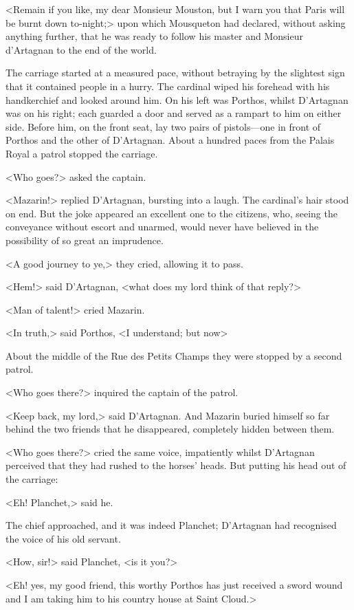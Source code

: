 <Remain if you like, my dear Monsieur Mouston, but I warn you that Paris will be burnt down to-night;> upon which Mousqueton had declared, without asking anything further, that he was ready to follow his master and Monsieur d'Artagnan to the end of the world.

The carriage started at a measured pace, without betraying by the slightest sign that it contained people in a hurry. The cardinal wiped his forehead with his handkerchief and looked around him. On his left was Porthos, whilst D'Artagnan was on his right; each guarded a door and served as a rampart to him on either side. Before him, on the front seat, lay two pairs of pistols—one in front of Porthos and the other of D'Artagnan. About a hundred paces from the Palais Royal a patrol stopped the carriage.

<Who goes?> asked the captain.

<Mazarin!> replied D'Artagnan, bursting into a laugh. The cardinal's hair stood on end. But the joke appeared an excellent one to the citizens, who, seeing the conveyance without escort and unarmed, would never have believed in the possibility of so great an imprudence.

<A good journey to ye,> they cried, allowing it to pass.

<Hem!> said D'Artagnan, <what does my lord think of that reply?>

<Man of talent!> cried Mazarin.

<In truth,> said Porthos, <I understand; but now\longdash>

About the middle of the Rue des Petits Champs they were stopped by a second patrol.

<Who goes there?> inquired the captain of the patrol.

<Keep back, my lord,> said D'Artagnan. And Mazarin buried himself so far behind the two friends that he disappeared, completely hidden between them.

<Who goes there?> cried the same voice, impatiently whilst D'Artagnan perceived that they had rushed to the horses' heads. But putting his head out of the carriage:

<Eh! Planchet,> said he.

The chief approached, and it was indeed Planchet; D'Artagnan had recognised the voice of his old servant.

<How, sir!> said Planchet, <is it you?>

<Eh!  yes, my good friend, this worthy Porthos has just received a sword wound and I am taking him to his country house at Saint Cloud.>

